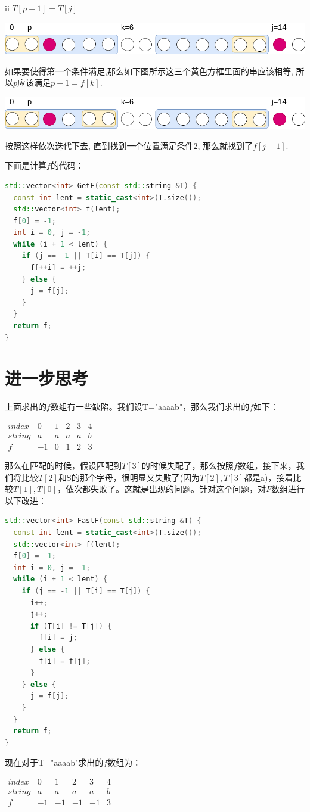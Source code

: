 \documentclass{article}
\begin{document}
ii $T[p+1]=T[j]$ \par
\includegraphics[scale=0.35]{pic5.png} \par
如果要使得第一个条件满足,那么如下图所示这三个黄色方框里面的串应该相等, 所以$p$应该满足$p+1=f[k]$. \par
\includegraphics[scale=0.35]{pic6.png} \par
按照这样依次迭代下去, 直到找到一个位置满足条件2, 那么就找到了$f[j+1]$. \par
下面是计算$f$的代码： \par
\begin{lstlisting}[language=C++, caption={Compute $f$}]
std::vector<int> GetF(const std::string &T) {
  const int lent = static_cast<int>(T.size());
  std::vector<int> f(lent);
  f[0] = -1;
  int i = 0, j = -1;
  while (i + 1 < lent) {
    if (j == -1 || T[i] == T[j]) {
      f[++i] = ++j;
    } else {
      j = f[j];
    }
  }
  return f;
}
\end{lstlisting}

\section{进一步思考}
上面求出的$f$数组有一些缺陷。我们设T="aaaab"，那么我们求出的$f$如下： \par

$\begin{matrix}
index & 0 & 1 & 2 & 3 & 4 \\ 
string & a & a & a & a & b \\ 
f & -1 & 0 & 1 & 2 & 3 
\end{matrix}$

那么在匹配的时候，假设匹配到$T[3]$的时候失配了，那么按照$f$数组，接下来，我们将比较$T[2]$和S的那个字母，很明显又失败了(因为$T[2],T[3]$都是a)，接着比较$T[1],T[0]$，依次都失败了。这就是出现的问题。针对这个问题，对$F$数组进行以下改进： \par
\begin{lstlisting}[language=C++, caption={Batter algorithm to compute $f$}]
std::vector<int> FastF(const std::string &T) {
  const int lent = static_cast<int>(T.size());
  std::vector<int> f(lent);
  f[0] = -1;
  int i = 0, j = -1;
  while (i + 1 < lent) {
    if (j == -1 || T[i] == T[j]) {
      i++;
      j++;
      if (T[i] != T[j]) {
        f[i] = j;
      } else {
        f[i] = f[j];
      }
    } else {
      j = f[j];
    }
  }
  return f;
}
\end{lstlisting}
现在对于T="aaaab"求出的$f$数组为： \par

$\begin{matrix}
index & 0 & 1 & 2 & 3 & 4 \\ 
string & a & a & a & a & b \\ 
f & -1 & -1 & -1 & -1 & 3 
\end{matrix}$
\end{document}
